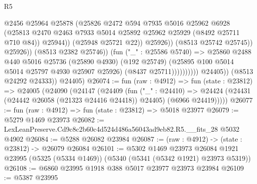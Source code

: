 \begin{lexlean}{R5}
\begin{coremodule}
                                            @2456
                                            @25964
                                            @25878
                                            (@25826
                                              @2472
                                              @594
                                              @7935
                                              @5016
                                              @25962
                                              @6928
                                              (@25813
                                                @2470
                                                @2463
                                                @7933
                                                @5014
                                                @25892
                                                @25962
                                                @25929
                                                (@8492 @25711 @710 @84))
                                              @25944))
                                          (@25948 @25721 @22))
                                        @25926))
                                    (@8513 @25742 @25745))
                                  @25926))
                              (@8513 @2382 @25746))
                            (fun ("_" : @25586 @5740) =>
                            @25860
                              @2488
                              @440
                              @5016
                              @25736
                              (@25890 @4930)
                              (@192 @25749)
                              (@25895 @100 @5014 @5014 @25797 @4930 @25907 @25926)
                              (@8437 @25711))))))))))
            @24405))
        (@8513 @24292 @24333))
      @24405)
@26074 := fun (raw : @4912) =>
  fun (state : @23812) =>
  @24005
    (@24090
      (@24147
        (@24409
          (fun ("_" : @24410) =>
          @24424 (@24431 (@24442 @26058 (@21323 @24416 @24418)) @24405) (@6966 @24419)))))
@26077 := fun (raw : @4912) => fun (state : @23812) => @5018 @23977
@26079 := @5279 @1469 @23973
@26082 := LexLeanPreserve.Cd9c8c2b60c4d524d486a56043ad9eb82.R5.__fits_28 @5032 @4902
@26084 := @5288 @26082 @23984
@26087 := (raw : @4912) -> (state : @23812) -> @26079 @26084
@26101 := @5302
    @1469
    @23973
    @26084
    @1921
    @23995
    (@5325 (@5334 @1469))
    (@5340 (@5341 (@5342 @1921) @23973 @5319))
@26108 := @6860 @23995 @1918 @388 @5017 @23977 @23973 @23984
@26109 := @5387 @23995

\end{coremodule}
\end{lexlean}
